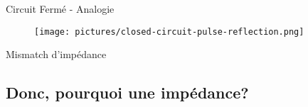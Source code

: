 \begin{frame}{Circuit Fermé - Analogie}
    \begin{figure}
        \centering
        \texttt{[image: pictures/closed-circuit-pulse-reflection.png]}
    \end{figure}
\end{frame}

\begin{frame}{Mismatch d'impédance}
\end{frame}

\subsection{Donc, pourquoi une impédance?}
